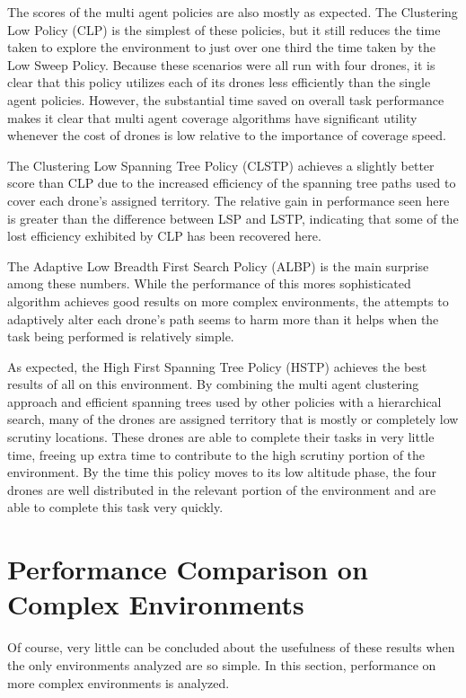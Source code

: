 The scores of the multi agent policies are also mostly as expected. The Clustering Low Policy (CLP) is the simplest of these policies, but it still reduces the time taken to explore the environment to just over one third the time taken by the Low Sweep Policy. Because these scenarios were all run with four drones, it is clear that this policy utilizes each of its drones less efficiently than the single agent policies. However, the substantial time saved on overall task performance makes it clear that multi agent coverage algorithms have significant utility whenever the cost of drones is low relative to the importance of coverage speed.

The Clustering Low Spanning Tree Policy (CLSTP) achieves a slightly better score than CLP due to the increased efficiency of the spanning tree paths used to cover each drone's assigned territory. The relative gain in performance seen here is greater than the difference between LSP and LSTP, indicating that some of the lost efficiency exhibited by CLP has been recovered here. 

The Adaptive Low Breadth First Search Policy (ALBP) is the main surprise among these numbers. While the performance of this mores sophisticated algorithm achieves good results on more complex environments, the attempts to adaptively alter each drone's path seems to harm more than it helps when the task being performed is relatively simple.

As expected, the High First Spanning Tree Policy (HSTP) achieves the best results of all on this environment. By combining the multi agent clustering approach and efficient spanning trees used by other policies with a hierarchical search, many of the drones are assigned territory that is mostly or completely low scrutiny locations. These drones are able to complete their tasks in very little time, freeing up extra time to contribute to the high scrutiny portion of the environment. By the time this policy moves to its low altitude phase, the four drones are well distributed in the relevant portion of the environment and are able to complete this task very quickly.

\section{Performance Comparison on Complex Environments}

Of course, very little can be concluded about the usefulness of these results when the only environments analyzed are so simple. In this section, performance on more complex environments is analyzed.

